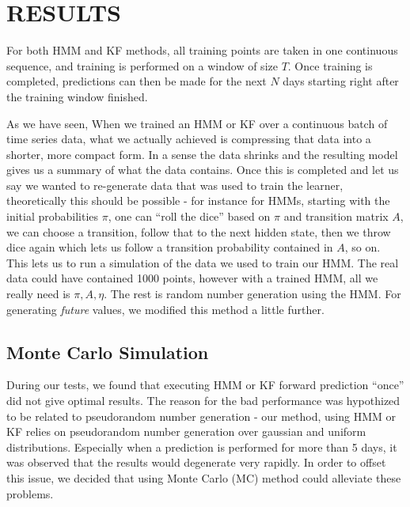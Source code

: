 \chapter{RESULTS}

For both HMM and KF methods, all training points are taken in one continuous
sequence, and training is performed on a window of size $T$. Once training is
completed, predictions can then be made for the next $N$ days starting right
after the training window finished.

As we have seen, When we trained an HMM or KF over a continuous batch of time
series data, what we actually achieved is compressing that data into a shorter,
more compact form. In a sense the data shrinks and the resulting model gives us
a summary of what the data contains. Once this is completed and let us say we
wanted to re-generate data that was used to train the learner, theoretically
this should be possible - for instance for HMMs, starting with the initial
probabilities $\pi$, one can ``roll the dice'' based on $\pi$ and transition
matrix $A$, we can choose a transition, follow that to the next hidden state,
then we throw dice again which lets us follow a transition probability contained
in $A$, so on. This lets us to run a simulation of the data we used to train our
HMM. The real data could have contained 1000 points, however with a trained HMM,
all we really need is $\pi, A, \eta$. The rest is random number generation using
the HMM. For generating {\em future} values, we modified this method a little
further.



\section{Monte Carlo Simulation}

During our tests, we found that executing HMM or KF forward prediction ``once''
did not give optimal results. The reason for the bad performance was hypothized
to be related to pseudorandom number generation - our method, using HMM or KF
relies on pseudorandom number generation over gaussian and uniform
distributions. Especially when a prediction is performed for more than 5 days,
it was observed that the results would degenerate very rapidly. In order to
offset this issue, we decided that using Monte Carlo (MC) method could alleviate
these problems.

